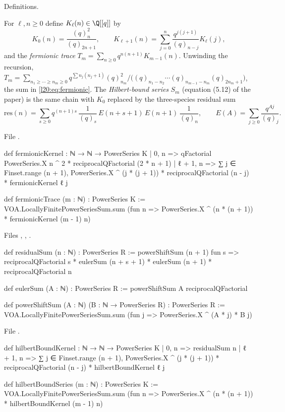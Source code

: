 \begin{status}
Definitions.
\end{status}

\begin{definition}\label{l20:def:chain}
For $\ell,n\ge0$ define $K_\ell(n)\in\Q[[q]]$ by
\begin{equation*}
K_0(n)=\frac{(q)_n^2}{(q)_{2n+1}},\qquad K_{\ell+1}(n)=\sum_{j=0}^n\frac{q^{j(j+1)}}{(q)_{n-j}}K_\ell(j),
\end{equation*}
and the \emph{fermionic trace} $T_m=\sum_{n\ge0}q^{n(n+1)}K_{m-1}(n)$. Unwinding the recursion,
$T_m=\sum_{n_1\ge\cdots\ge n_m\ge0}q^{\sum n_j(n_j+1)}(q)_{n_m}^2/\bigl((q)_{n_1-n_2}\cdots
(q)_{n_{m-1}-n_m}(q)_{2n_m+1}\bigr)$, the sum in \eqref{l20:eq:fermionic}. The \emph{Hilbert-bound series}
$S_m$ (equation (5.12) of the paper) is the same chain with $K_0$ replaced by the three-species residual sum
\begin{equation*}
\mathrm{res}(n)=\sum_{s\ge0}q^{(n+1)s}\,\frac{1}{(q)_s}\,E(n+s+1)\,E(n+1)\,\frac{1}{(q)_n},\qquad
E(A)=\sum_{j\ge0}\frac{q^{Aj}}{(q)_j}.
\end{equation*}
\end{definition}
\noindent File .
\begin{leancode}
def fermionicKernel : ℕ → ℕ → PowerSeries K
  | 0, n => qFactorial PowerSeries.X n ^ 2 * reciprocalQFactorial (2 * n + 1)
  | ℓ + 1, n => ∑ j ∈ Finset.range (n + 1),
      PowerSeries.X ^ (j * (j + 1)) * reciprocalQFactorial (n - j) * fermionicKernel ℓ j

def fermionicTrace (m : ℕ) : PowerSeries K :=
  VOA.LocallyFinitePowerSeriesSum.sum (fun n =>
    PowerSeries.X ^ (n * (n + 1)) * fermionicKernel (m - 1) n)
\end{leancode}
\noindent Files ,
,
.
\begin{leancode}
def residualSum (n : ℕ) : PowerSeries R :=
  powerShiftSum (n + 1) fun s =>
    reciprocalQFactorial s * eulerSum (n + s + 1) *
      eulerSum (n + 1) * reciprocalQFactorial n

def eulerSum (A : ℕ) : PowerSeries R :=
  powerShiftSum A reciprocalQFactorial

def powerShiftSum (A : ℕ) (B : ℕ → PowerSeries R) : PowerSeries R :=
  VOA.LocallyFinitePowerSeriesSum.sum (fun j => PowerSeries.X ^ (A * j) * B j)
\end{leancode}
\noindent File .
\begin{leancode}
def hilbertBoundKernel : ℕ → ℕ → PowerSeries K
  | 0, n => residualSum n
  | ℓ + 1, n => ∑ j ∈ Finset.range (n + 1),
      PowerSeries.X ^ (j * (j + 1)) * reciprocalQFactorial (n - j) * hilbertBoundKernel ℓ j

def hilbertBoundSeries (m : ℕ) : PowerSeries K :=
  VOA.LocallyFinitePowerSeriesSum.sum (fun n =>
    PowerSeries.X ^ (n * (n + 1)) * hilbertBoundKernel (m - 1) n)
\end{leancode}

